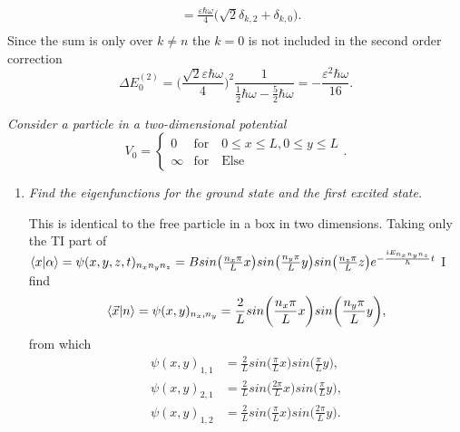 \begin{example}
\begin{equation}
\begin{split}
			&=\frac{\varepsilon\hbar\omega}{4}\bigg(\sqrt{2}\delta_{k,2}+\delta_{k,0}\bigg).\\
		\end{split}
		\label{shit}
	\end{equation} 
	Since the sum is only over $k\neq n$ the $k=0$ is not included in the second order correction
	\begin{equation}
		\Delta E_0^{(2)}=\bigg(\frac{\sqrt{2}\varepsilon\hbar\omega}{4}\bigg)^2\frac{1}{\frac{1}{2}\hbar\omega-\frac{5}{2}\hbar\omega}=-\frac{\varepsilon^2\hbar\omega}{16}.
	\end{equation} 
\end{example}

\begin{example}
	\emph{Consider a particle in a two-dimensional potential}
	\begin{equation}
		V_0=\begin{cases} 0 &\mbox{for} \quad 0\leq x\leq L, 0\leq y \leq L \\ 
			\infty & \mbox{for} \quad \mbox{Else}  
		\end{cases}. 
	\end{equation} 
	\begin{enumerate}
		\item \emph{Find the eigenfunctions for the ground state and the first excited state.}\newline
		
		This is identical to the free particle in a box in two dimensions. Taking only the TI part of $\braket{x|\alpha}=\psi(x,y,z,t)_{n_xn_yn_z}=Bsin\big(\frac{n_x\pi}{L}x\big)sin\big(\frac{n_y\pi}{L}y\big)sin\big(\frac{n_z\pi}{L}z\big)e^{-\frac{iE_{n_xn_yn_z}}{\hbar}t}$ I find
		\begin{equation}
			\braket{\vec{x}|n}=\psi(x,y)_{n_x,n_y}=\frac{2}{L}sin\bigg(\frac{n_x\pi}{L}x\bigg)sin\bigg(\frac{n_y\pi}{L}y\bigg),
		\end{equation} 
		from which
		\begin{equation}
			\begin{split}
				\psi(x,y)_{1,1}&=\frac{2}{L}sin\bigg(\frac{\pi}{L}x\bigg)sin\bigg(\frac{\pi}{L}y\bigg),\\
				\psi(x,y)_{2,1}&=\frac{2}{L}sin\bigg(\frac{2\pi}{L}x\bigg)sin\bigg(\frac{\pi}{L}y\bigg),\\
				\psi(x,y)_{1,2}&=\frac{2}{L}sin\bigg(\frac{\pi}{L}x\bigg)sin\bigg(\frac{2\pi}{L}y\bigg).\\
			\end{split}
			\label{fe}
		\end{equation} 
		

\end{enumerate}
\end{example}
